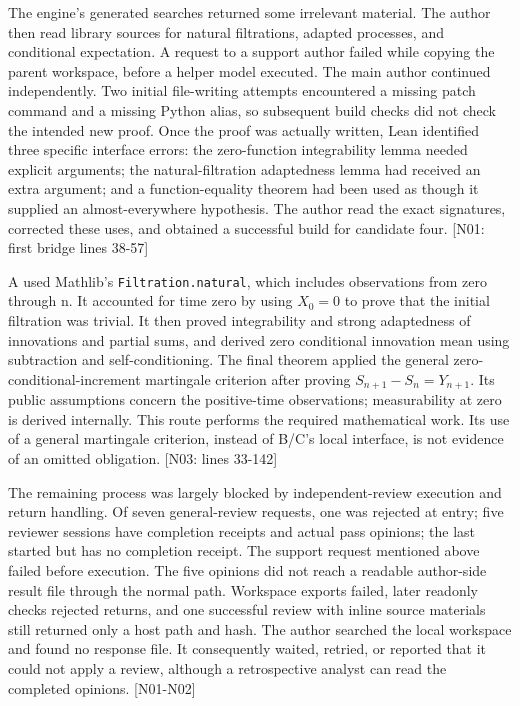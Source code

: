 The engine's generated searches returned some irrelevant material. The author then read library sources for natural filtrations, adapted processes, and conditional expectation. A request to a support author failed while copying the parent workspace, before a helper model executed. The main author continued independently. Two initial file-writing attempts encountered a missing patch command and a missing Python alias, so subsequent build checks did not check the intended new proof. Once the proof was actually written, Lean identified three specific interface errors: the zero-function integrability lemma needed explicit arguments; the natural-filtration adaptedness lemma had received an extra argument; and a function-equality theorem had been used as though it supplied an almost-everywhere hypothesis. The author read the exact signatures, corrected these uses, and obtained a successful build for candidate four. [N01: first bridge lines 38-57]

A used Mathlib's \nolinkurl{Filtration.natural}, which includes observations from zero through n. It accounted for time zero by using $X_0=0$ to prove that the initial filtration was trivial. It then proved integrability and strong adaptedness of innovations and partial sums, and derived zero conditional innovation mean using subtraction and self-conditioning. The final theorem applied the general zero-conditional-increment martingale criterion after proving $S_{n+1}-S_n=Y_{n+1}$. Its public assumptions concern the positive-time observations; measurability at zero is derived internally. This route performs the required mathematical work. Its use of a general martingale criterion, instead of B/C's local interface, is not evidence of an omitted obligation. [N03: lines 33-142]

The remaining process was largely blocked by independent-review execution and return handling. Of seven general-review requests, one was rejected at entry; five reviewer sessions have completion receipts and actual pass opinions; the last started but has no completion receipt. The support request mentioned above failed before execution. The five opinions did not reach a readable author-side result file through the normal path. Workspace exports failed, later readonly checks rejected returns, and one successful review with inline source materials still returned only a host path and hash. The author searched the local workspace and found no response file. It consequently waited, retried, or reported that it could not apply a review, although a retrospective analyst can read the completed opinions. [N01-N02]

